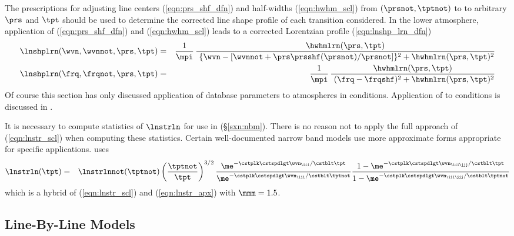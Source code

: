 \documentclass[12pt]{article}
\begin{document}
The prescriptions for adjusting line centers (\ref{eqn:prs_shf_dfn})
and half-widths (\ref{eqn:hwhm_scl}) from $(\prsnot,\tptnot)$ to
to arbitrary $\prs$ and $\tpt$ should be used to determine the 
corrected line shape profile of each transition considered.
In the lower atmosphere, application of (\ref{eqn:prs_shf_dfn})
and (\ref{eqn:hwhm_scl}) leads to a corrected Lorentzian profile 
(\ref{eqn:lnshp_lrn_dfn}) 
\begin{eqnarray}
\lnshplrn(\wvn,\wvnnot,\prs,\tpt) & = & 
\frac{1}{\mpi} \,
\frac{\hwhmlrn(\prs,\tpt)}{\
\{ \wvn - [\wvnnot + \prs \prsshf(\prsnot)/\prsnot] \}^{2} + 
\hwhmlrn(\prs,\tpt)^{2}} \nonumber \\
\lnshplrn(\frq,\frqnot,\prs,\tpt) & = & 
\frac{1}{\mpi} \,
\frac{\hwhmlrn(\prs,\tpt)}{\
(\frq - \frqshf)^{2} + \hwhmlrn(\prs,\tpt)^{2}}
\label{eqn:lnshp_lrn_crc_dfn}
\end{eqnarray}
Of course this section has only discussed application of 
database parameters to atmospheres in  conditions.
Application of \acr{HITRAN} to 
conditions is discussed in \cite{GaR92}.

It is necessary to compute statistics of $\lnstrln$ for use in
 (\S\ref{sxn:nbm}).
There is no reason not to apply the full approach of
(\ref{eqn:lnstr_scl}) when computing these statistics.
Certain well-documented narrow band models use more approximate forms
appropriate for specific applications.
\cite{Bri922} uses
\begin{eqnarray}
\lnstrln(\tpt) & = & \lnstrlnnot(\tptnot)
\left( \frac{\tptnot}{\tpt} \right)^{3/2}
\frac{\me^{-\cstplk \cstspdlgt \wvn_{\iii} / \cstblt \tpt }}
{\me^{-\cstplk \cstspdlgt \wvn_{\iii} / \cstblt \tptnot}}
\frac{1 -  \me^{-\cstplk \cstspdlgt \wvn_{\iii \jjj} / \cstblt \tpt }}
{1 -  \me^{-\cstplk \cstspdlgt \wvn_{\iii \jjj} / \cstblt \tptnot }}
\label{eqn:lnstr_mlk}
\end{eqnarray}
which is a hybrid of (\ref{eqn:lnstr_scl}) and (\ref{eqn:lnstr_apx})
with $\mmm = 1.5$.

\subsection[Line-By-Line Models]{Line-By-Line Models}\label{sxn:lbl}
\end{document}
